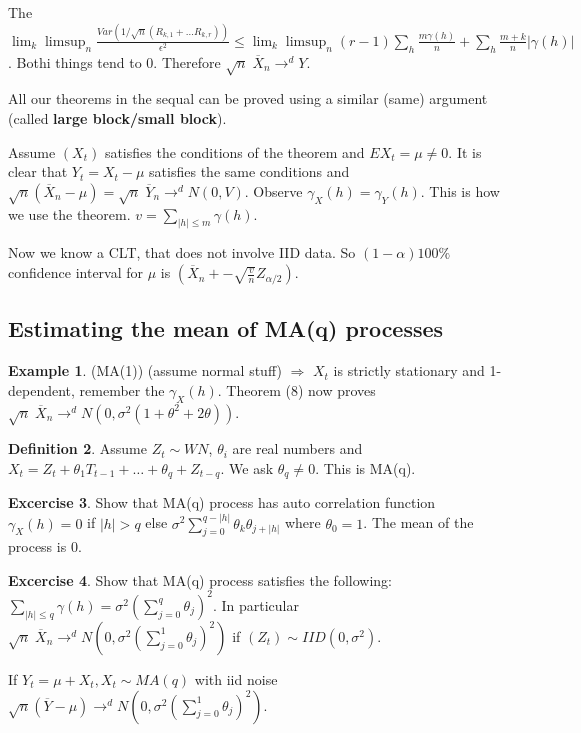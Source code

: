 \documentclass[12pt,a4paper]{amsart}
\theoremstyle{definition} %
\newtheorem{defn}{Definition}[section]
\newtheorem{example}[defn]{Example}
\newtheorem{excercise}[defn]{Excercise}
\theoremstyle{plain} %
\begin{document}
The $\lim_k \limsup_n \frac{Var(1/\sqrt{n}(R_{k,1} + \dots R_{k,r}))}{\epsilon^2} \leq \lim_k \limsup_n (r-1) \sum_h \frac{m \gamma(h)}{n} + \sum_h \frac{m+k}{n}|\gamma(h)|$. Bothi things tend to $0$. Therefore $\sqrt{n}\; \overline{X}_n \rightarrow^d Y$. 
\endproof


All our theorems in the sequal can be proved using a similar (same) argument (called {\bf large block/small block}).

Assume $(X_t)$ satisfies the conditions of the theorem and $E X_t = \mu \neq 0$. It is clear that $Y_t = X_t - \mu$ satisfies the same conditions and $\sqrt{n} (\overline{X}_n - \mu) = \sqrt{n}\; \overline{Y}_n \rightarrow^d N(0,V)$. Observe $\gamma_X(h) = \gamma_Y(h)$. This is how we use the theorem. $v = \sum_{|h| \leq m} \gamma(h)$.


Now we know a CLT, that does not involve IID data. So $(1 - \alpha) 100 \%$ confidence interval for $\mu$ is 
$(\overline{X}_n +- \sqrt{\frac{v}{n}}Z_{\alpha/2})$. 

\subsection{Estimating the mean of MA(q) processes}

\begin{example} (MA(1))
(assume normal stuff) $\Rightarrow$ $ X_t$ is strictly stationary and 1-dependent, remember the $\gamma_X(h)$. Theorem 
(8) now proves $\sqrt{n} \; \overline{X}_n \rightarrow^d N(0, \sigma^2 (1 + \theta^2 + 2\theta))$.
\end{example}

\begin{defn}
Assume $Z_t \sim WN$, $\theta_i$ are real numbers and $X_t = Z_t + \theta_1 T_{t-1} + \dots + \theta_q + Z_{t-q}$. We ask $\theta_q \neq 0$. This is MA(q).
\end{defn}

\begin{excercise}
Show that MA(q) process has auto correlation function 
$\gamma_X(h) = 0$ if $|h| > q$ else $\sigma^2 \sum_{j = 0}^{q - |h|}\theta_k \theta_{j + |h|}$ where $\theta_0 = 1$. The mean of the process is $0$.
\end{excercise}

\begin{excercise}
Show that MA(q) process satisfies the following:
$\sum_{|h| \leq q} \gamma(h) = \sigma^2(\sum_{j = 0}^q \theta_j)^2$. In particular
$\sqrt{n } \; \overline{X}_n \rightarrow^d N(0, \sigma^2(\sum_{j=0}^1 \theta_j)^2)$ if $(Z_t) \sim IID(0, \sigma^2)$.

If $Y_t = \mu + X_t, X_t \sim MA(q)$ with iid noise 
$\sqrt{n}(\overline{Y} - \mu) \rightarrow^d N(0, \sigma^2(\sum_{j=0}^1 \theta_j)^2)$.
\end{excercise}
\end{document}
